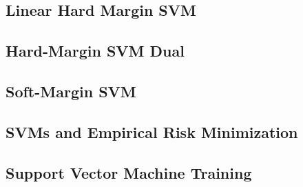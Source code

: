 
\subsection{Linear Hard Margin SVM}


\subsection{Hard-Margin SVM Dual}


\subsection{Soft-Margin SVM}


\subsection{SVMs and Empirical Risk Minimization}


\subsection{Support Vector Machine Training}


